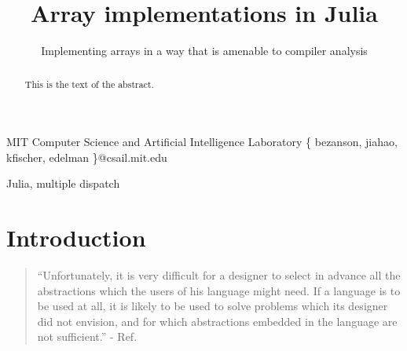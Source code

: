 \documentclass[preprint]{sigplanconf}
\begin{document}
\setlength{\pdfpageheight}{\paperheight}
\setlength{\pdfpagewidth}{\paperwidth}




\permissiontopublish             %


\title{Array implementations in Julia}
\subtitle{Implementing arrays in a way that is amenable to compiler analysis}

           {MIT Computer Science and Artificial Intelligence Laboratory}
           {\{ bezanson, jiahao, kfischer, edelman \}@csail.mit.edu}


\maketitle

\begin{abstract}
This is the text of the abstract.
\end{abstract}


\keywords
Julia, multiple dispatch

\section{Introduction}

\begin{quotation}
``Unfortunately, it is very difficult for a designer to select in advance all
the abstractions which the users of his language might need. If a language is
to be used at all, it is likely to be used to solve problems which its
designer did not envision, and for which abstractions embedded in the language
are not sufficient.'' - Ref. \cite{Liskov:1974pb}
\end{quotation}
\end{document}
